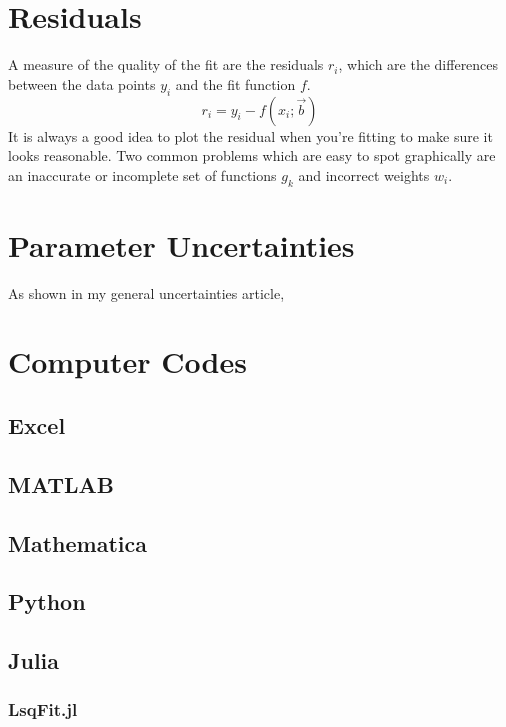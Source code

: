 \documentclass{scrartcl}
\begin{document}
\section{Residuals}
A measure of the quality of the fit are the residuals $r_i$, which
are the differences between the data points $y_i$ and the
fit function $f$.
\begin{equation}
r_i = y_i - f(x_i;\vec{b})
\end{equation}
It is always a good idea to plot the residual when you're fitting
to make sure it looks reasonable. Two common problems which
are easy to spot graphically are an inaccurate or incomplete
set of functions $g_k$ and incorrect weights $w_i$.

\section{Parameter Uncertainties}
As shown in my general uncertainties article\cite{uncertainties},

\appendix

\section{Computer Codes}

\subsection{Excel}
\subsection{MATLAB}
\subsection{Mathematica}
\subsection{Python}

\subsection{Julia}
\subsubsection{LsqFit.jl}
\end{document}
